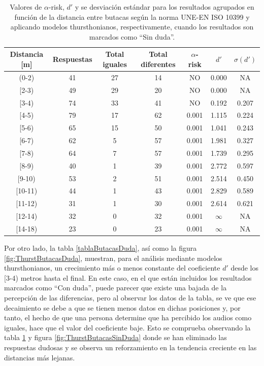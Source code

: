 \documentclass[11pt,a4paper,twoside]{book}
\begin{document}
		    \begin{table}[H]
			\begin{center}
			\begin{scriptsize}
			\begin{tabular}{| c | c | c | c || c | c | c |}
			    \hline
				\textbf{Distancia [m]}&\textbf{Respuestas}&\textbf{Total iguales}&\textbf{Total diferentes}&\textbf{$\alpha$-risk}&\textbf{$d'$}&\textbf{$\sigma (d')$}\\ \hline
                (0-2)&41&27&14&NO&0.000&NA\\ \hline
                [2-3)&49&29&20&NO&0.000&NA\\ \hline
                [3-4)&74&33&41&NO&0.192&0.207\\ \hline
                [4-5)&79&17&62&0.001&1.115&0.224\\ \hline
                [5-6)&65&15&50&0.001&1.041&0.243\\ \hline
                [6-7)&62&5&57&0.001&1.981&0.327\\ \hline
                [7-8)&64&7&57&0.001&1.739&0.295\\ \hline
                [8-9)&40&1&39&0.001&2.772&0.597\\ \hline
                [9-10)&53&2&51&0.001&2.514&0.450\\ \hline
                [10-11)&44&1&43&0.001&2.829&0.589\\ \hline
                [11-12)&31&1&30&0.001&2.614&0.621\\ \hline
                [12-14)&32&0&32&0.001&$\infty$&NA\\ \hline
                [14-18)&23&0&23&0.001&$\infty$&NA\\ \hline
			\end{tabular}
			\caption{Valores de $\alpha$-risk, $d'$ y se desviación estándar para los resultados agrupados en función de la distancia entre butacas según la norma UNE-EN ISO 10399 y aplicando modelos thursthonianos, respectivamente, cuando los resultados son marcados como ``Sin duda''.}
			\label{tablaButacasSinDuda}
			\end{scriptsize}
			\end{center}	
		    \end{table}
            
            
            Por otro lado, la tabla \ref{tablaButacasDuda}, así como la figura \ref{fig:ThurstButacasDuda}, muestran, para el análisis mediante modelos thursthonianos, un crecimiento más o menos constante del coeficiente $d'$ desde los [3-4) metros hasta el final. En este caso, en el que están incluidos los resultados marcados como ``Con duda'', puede parecer que existe una bajada de la percepción de las diferencias, pero al observar los datos de la tabla, se ve que ese decaimiento se debe a que se tienen menos datos en dichas posiciones y, por tanto, el hecho de que una persona determine que ha percibido los audios como iguales, hace que el valor del coeficiente baje. Esto se comprueba observando la tabla \ref{tablaButacasSinDuda} y figura \ref{fig:ThurstButacasSinDuda} donde se han eliminado las respuestas dudosas y se observa un reforzamiento en la tendencia creciente en las distancias más lejanas.
		    
\end{document}
